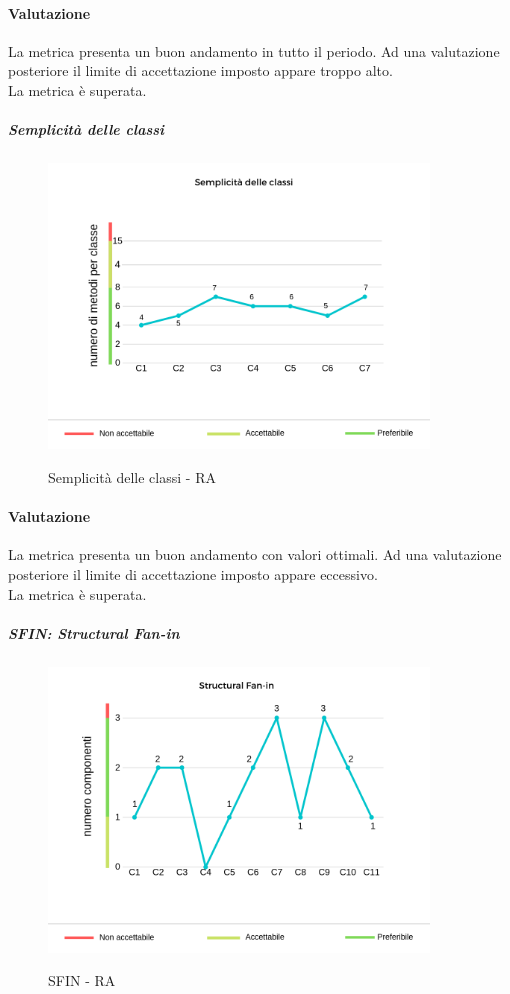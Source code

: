 	\paragraph*{Valutazione} La metrica presenta un buon andamento in tutto il periodo. Ad una valutazione posteriore il limite di accettazione imposto appare troppo alto.
	\\ La metrica è superata.
	\pagebreak
	\subparagraph{Semplicità delle classi}
	\begin{center}
		\begin{figure}[h] 
			\centering 
			\includegraphics[width=0.90\textwidth]{res/images/new/semplicitaClassi.png}\\
			\caption{Semplicità delle classi - RA}
		\end{figure}
	\end{center}
	\paragraph*{Valutazione} La metrica presenta un buon andamento con valori ottimali. Ad una valutazione posteriore il limite di accettazione imposto appare eccessivo. 
	\\ La metrica è superata.
	\pagebreak
	\subparagraph{SFIN: Structural Fan-in}
	\begin{center}
		\begin{figure}[h] 
			\centering 
			\includegraphics[width=0.90\textwidth]{res/images/new/sfin.png}\\
			\caption{SFIN - RA}
		\end{figure}
	\end{center}

